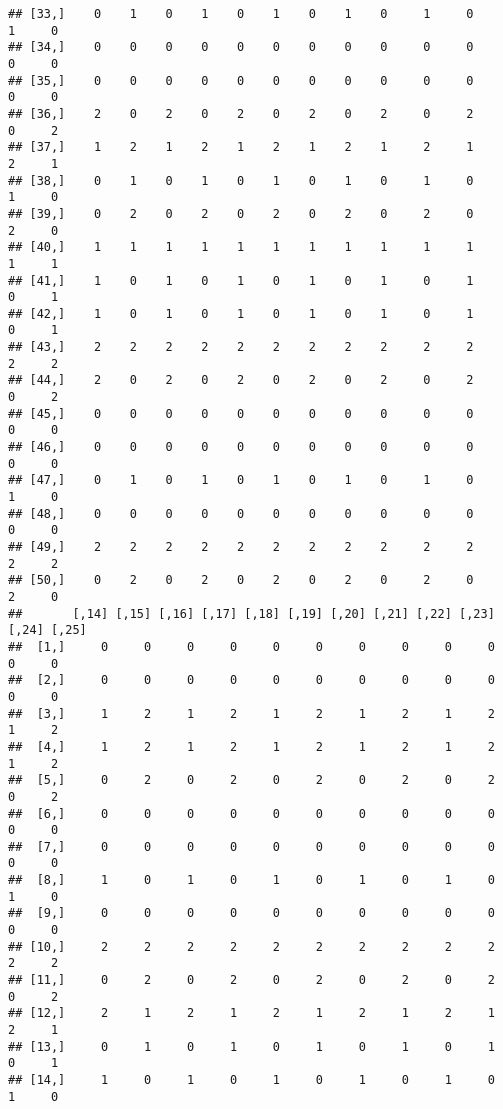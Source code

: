 \documentclass[
]{article}
\begin{document}
\begin{verbatim}
## [33,]    0    1    0    1    0    1    0    1    0     1     0     1     0
## [34,]    0    0    0    0    0    0    0    0    0     0     0     0     0
## [35,]    0    0    0    0    0    0    0    0    0     0     0     0     0
## [36,]    2    0    2    0    2    0    2    0    2     0     2     0     2
## [37,]    1    2    1    2    1    2    1    2    1     2     1     2     1
## [38,]    0    1    0    1    0    1    0    1    0     1     0     1     0
## [39,]    0    2    0    2    0    2    0    2    0     2     0     2     0
## [40,]    1    1    1    1    1    1    1    1    1     1     1     1     1
## [41,]    1    0    1    0    1    0    1    0    1     0     1     0     1
## [42,]    1    0    1    0    1    0    1    0    1     0     1     0     1
## [43,]    2    2    2    2    2    2    2    2    2     2     2     2     2
## [44,]    2    0    2    0    2    0    2    0    2     0     2     0     2
## [45,]    0    0    0    0    0    0    0    0    0     0     0     0     0
## [46,]    0    0    0    0    0    0    0    0    0     0     0     0     0
## [47,]    0    1    0    1    0    1    0    1    0     1     0     1     0
## [48,]    0    0    0    0    0    0    0    0    0     0     0     0     0
## [49,]    2    2    2    2    2    2    2    2    2     2     2     2     2
## [50,]    0    2    0    2    0    2    0    2    0     2     0     2     0
##       [,14] [,15] [,16] [,17] [,18] [,19] [,20] [,21] [,22] [,23] [,24] [,25]
##  [1,]     0     0     0     0     0     0     0     0     0     0     0     0
##  [2,]     0     0     0     0     0     0     0     0     0     0     0     0
##  [3,]     1     2     1     2     1     2     1     2     1     2     1     2
##  [4,]     1     2     1     2     1     2     1     2     1     2     1     2
##  [5,]     0     2     0     2     0     2     0     2     0     2     0     2
##  [6,]     0     0     0     0     0     0     0     0     0     0     0     0
##  [7,]     0     0     0     0     0     0     0     0     0     0     0     0
##  [8,]     1     0     1     0     1     0     1     0     1     0     1     0
##  [9,]     0     0     0     0     0     0     0     0     0     0     0     0
## [10,]     2     2     2     2     2     2     2     2     2     2     2     2
## [11,]     0     2     0     2     0     2     0     2     0     2     0     2
## [12,]     2     1     2     1     2     1     2     1     2     1     2     1
## [13,]     0     1     0     1     0     1     0     1     0     1     0     1
## [14,]     1     0     1     0     1     0     1     0     1     0     1     0

\end{verbatim}
\end{document}
